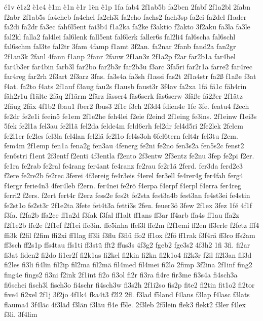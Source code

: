 {é1v
é1z2
è1c4
è1m
è1n
è1r
1ën
ê1p
1fa
fab4
2f1ab5b
fa2ben
2fabf
2f1a2bl
2fabn
f2abr
2f1ab5s
fa4cheb
fa4chel
fa2ch3i
fa2cho
fachs2
fach3sp
fa2ci
fa2del
f1ader
fa2di
fa2dr
fa3ec
fah6l5ent
fai3b4
f1a2ka
fa2ke
f3aktio
f2akto
3f2aku
fa3la
fa3le
fal2kl
falla2
fal4lei
fal6lenk
fall5ent
fal6lerk
faller6s
fal2li4
fal6scha
fal6schl
fal6schm
fal3te
fal2tr
3fam
4famp
f1amt
3f2an.
fa2nar
2fanb
fand2a
fan2gr
2f1an3k
2fanl
4fann
f1anp
2fanr
2fanw
2f1an3z
2f1a2p
f2ar
far2b1a
far4bel
far4b3er
far4bin
farb3l
far2bo
far2b3r
far2b3u
f3arc
3fa5ri
far2r1a
farre2
far4rec
far4reg
far2rh
2f3art
2f3arz
3fas.
fa3s4a
fa3sh
f1assi
fas2t
2f1a4str
fa2ß
f1aße
f3at
f4at.
fa2to
f4ats
2f1auf
f3aug
fau2s
f1ausb
faust3r
3f4av
fa2xa
1fä
fä1c
fäh4rin
fäh2r1u
f1älte
2fäq
2f1ärm
2färz
fässer4
fäs6serk
fäs6serw
3fäßc
fä2ßer
2f1ätz
2fäug
2fäx
4f1b2
fbau1
fber2
fbus3
2f1c
f3ch
2f3d4
fdien4e
1fe
3fe.
featu4
f2ech
fe2dr
fe2e1i
feein5
fe1em
2f1e2he
feh4lei
f2eie
f2eind
2f1eing
fe3ins.
2f1einw
f1ei3s
5fek
fe2l1a
fel3au
fe2l1ä
fel2da
felde4m
feld6erh
fel2dr
fel4d5ri
2fe2lek
2felem
fe2l1er
fe2les
fel3la
fel4lan
fel2lä
fe2l1o
fel4s3oh
6fel6tern
felt4r
fel3tu
f2em.
fem4m
2f1emp
fen1a
fena2g
fen3au
4fenerg
fe2ni
fe2no
fen3s2a
fen5s2c
fenst2
fen6stri
f1ent
2f3entf
f2enti
4f3entla
f2ento
2f3entw
2f3entz
fe2nu
3fep
fe2pi
f2er.
fe1ra
fe2rab
fe2ral
fe4rang
fer4ant
fe4ranz
fe2rau
fe2r1ä
2ferd.
fer3da
ferd2e3
f2ere
fe2re2b
fe2rec
3ferei
4f3ereig
fe4r3eis
f4erel
fer3ell
fe4rer4g
fer4fah
ferg4
f4ergr
ferie4n3
4fer4leb
f2ern.
fer4nei
fe2rö
f4erpa
f4erpf
f4erpl
f4erra
fer4reg
ferri2
f2ers.
f2ert
fert4r
f2erz
fess2e
fes2t
fe2sta
fest3a4b
fest3an
fe4st3ei
fe4stin
fe2st1o
fe2st3r
2f1e2ta
3fete
fet4t3a
fetti3s
2feu.
feuer3ö
3few
2f1ex
3fez
1fé
4f1f
f3fa.
f2fa2b
ffa2ce
ff1a2d
f3fak
f3fal
ff1alt
ff1ans
ff3ar
ff4arb
ffa4s
ff1au
ffa2z
f2f1e2b
ffe2e
f2f1ef
f2f1ei
ffe3in.
ffe5inha
ffel3l
ffe2m
f2f1emi
ff2en
ff3erle
f2fetz
fff4
ffi3k
f2fil
f2fim
ffi2xi
ff1lag
ff3li
f3flu
f3flü
ffo2
ff1ox
f2fö
ff1rak
f3f4rä
ff3ro
ffs2am
ff3sch
ff2s1p
ffs4tau
ffs1ti
ff3stü
fft2
ffus3s
4f3g2
fgeb2
fge3s2
4f3h2
1fi
3fi.
fi2ar
fi3at
fiden2
fi2do
fi1er2f
fi2k1as
fi2kel
fi2kin
fi2kn
fi2k1o4
fi2k3r
f2il
fi2l3an
fil3d
fi2les
fi3li
fi4lin
fil2ip
fil2ma
fil2mä
fil4med
fil4mei
fi2lo
2fimp
3f2ina
2f1inf
fing2
fing4e
fings2
fi3ni
f2ink
2f1int
fi2o
fi3ol
fi2r
fi3ra
fi4re
fir3me
fi3s4a
fi4sch3a
fi6schei
fisch3l
fisch3o
fi4schr
fi4sch3w
fi3s2h
2f1i2so
fis2p
fite2
fi2tin
fit1o2
fi2tor
five4
fi2xel
2f1j
3f2jo
4f1k4
fka4t3
f2l2
2fl.
f3lad
f5land
f4lans
f3lap
f4lasc
f3lats
flauma4
3f4läc
4f3läd
f3län
f3läu
fl4e
f5le.
2f3leb
2f5lein
flek3
flekt2
f3ler
f4lex
f3li.
3f4lim
}
